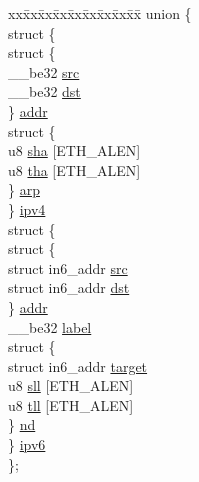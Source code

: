 \begin{DoxyCompactItemize}
\begin{tabbing}
\end{tabbing}\item 
\begin{tabbing}
xx\=xx\=xx\=xx\=xx\=xx\=xx\=xx\=xx\=\kill
union \{\\
\>struct \{\\
\>\>struct \{\\
\>\>\>\_\_be32 \hyperlink{structsw__flow__key_ab5368dd5350124baac85c3be19febb12}{src}\\
\>\>\>\_\_be32 \hyperlink{structsw__flow__key_a05994d9d99af2b8a8bcd66ce255ca40c}{dst}\\
\>\>\} \hyperlink{structsw__flow__key_abfc28adb05f413bcc53e68c773144f0a}{addr}\\
\>\>struct \{\\
\>\>\>u8 \hyperlink{structsw__flow__key_aec0c2988805dcc1e85d3dd508b1eff9f}{sha} \mbox{[}ETH\_ALEN\mbox{]}\\
\>\>\>u8 \hyperlink{structsw__flow__key_a48eba3d8570ada988ca07dd926b61a5f}{tha} \mbox{[}ETH\_ALEN\mbox{]}\\
\>\>\} \hyperlink{structsw__flow__key_a0932eb34cba8111bb3b37bf106ba7a59}{arp}\\
\>\} \hyperlink{structsw__flow__key_aeb4295bcb2fb4efea5c30337b871a423}{ipv4}\\
\>struct \{\\
\>\>struct \{\\
\>\>\>struct in6\_addr \hyperlink{structsw__flow__key_ae1e86390146b7cad7fd1c0b171011484}{src}\\
\>\>\>struct in6\_addr \hyperlink{structsw__flow__key_a9d6f8c300bf7a75527c05d7f9e88270d}{dst}\\
\>\>\} \hyperlink{structsw__flow__key_a60452748303b04851a89b07ecd39b94a}{addr}\\
\>\>\_\_be32 \hyperlink{structsw__flow__key_a92faa50d10672469aa891e2ae63aa692}{label}\\
\>\>struct \{\\
\>\>\>struct in6\_addr \hyperlink{structsw__flow__key_a12bf2f042022c3c7f8324ad1727f5df0}{target}\\
\>\>\>u8 \hyperlink{structsw__flow__key_ae937ac892919b521d123b4e63d5656e6}{sll} \mbox{[}ETH\_ALEN\mbox{]}\\
\>\>\>u8 \hyperlink{structsw__flow__key_a0462e7a44643ceeabd560cd179d342c1}{tll} \mbox{[}ETH\_ALEN\mbox{]}\\
\>\>\} \hyperlink{structsw__flow__key_a0f5f6c87614b5b84cf3e7fd5a59b41bb}{nd}\\
\>\} \hyperlink{structsw__flow__key_a6b13e14d62eb632b05378784a2d61f87}{ipv6}\\
\}; \\

\end{tabbing}\end{DoxyCompactItemize}


